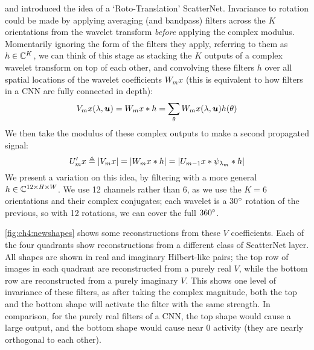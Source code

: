 \cite{sifre_rotation_2013} and \cite{oyallon_deep_2015} introduced the idea of
a `Roto-Translation' ScatterNet. Invariance to rotation could be made by
applying averaging (and bandpass) filters across the $K$ orientations 
from the wavelet transform \emph{before} applying the complex modulus.
Momentarily ignoring the form of the filters they apply, referring to them
as $h\in \complexes[K]$, we can think of this stage as stacking the $K$
outputs of a complex wavelet transform on top of each other, and convolving
these filters $h$ over all spatial locations of the wavelet coefficients $W_m
x$ (this is equivalent to how filters in a CNN are fully connected
in depth):
\begin{equation}
  V_m x(\lambda, \bm{u}) = W_{m}x \conv h = \sum_{\theta} W_{m}x(\lambda, \bm{u})
h(\theta)
\end{equation}
We then take the modulus of these complex outputs to make a second propagated
signal:
\begin{equation}
  U_{m}'x \definedas |V_{m}x| = |W_{m}x \conv h| = |U_{m-1}x
  \conv \psi_{\lambda_{m}} \conv h|
\end{equation}
We present a variation on this idea, by filtering with a more general 
$h\in \complexes[12\x H\x W]$. We use 12 channels rather than 6, as we use
the $K=6$ orientations and their complex conjugates; each wavelet is a 30$\degs$
rotation of the previous, so with 12 rotations, we can cover the full
$360\degs$. 

\autoref{fig:ch4:newshapes} shows some reconstructions from these $V$ coefficients.
Each of the four quadrants show reconstructions from a different class of
ScatterNet layer. 
All shapes are shown in real and imaginary Hilbert-like pairs; the top row of
images in each quadrant are reconstructed from a purely real $V$, while the bottom row 
are reconstructed from a purely imaginary $V$. This shows one level of invariance of
these filters, as after taking the complex magnitude, both the top and the
bottom shape will activate the filter with the same strength. In comparison, for
the purely real filters of a CNN, the top shape would cause a large output, and
the bottom shape would cause near 0 activity (they are nearly orthogonal to each
other).

